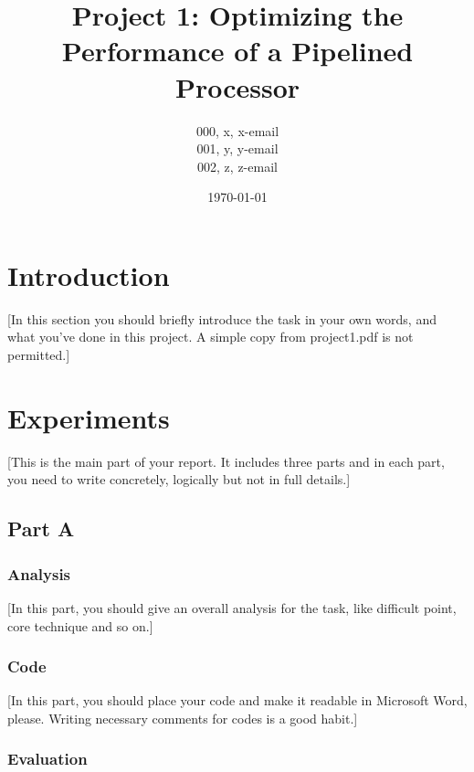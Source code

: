 \documentclass{article}
\title{\textbf{Project 1: Optimizing the Performance of a Pipelined Processor}} %
\author{000, x, x-email \\
        001, y, y-email \\
        002, z, z-email } %
\date{\today} %
\begin{document}
\maketitle %

\section{Introduction}

[In this section you should briefly introduce the task in your own words, and what you’ve done in this project. A simple copy from project1.pdf is not permitted.] \\


\section{Experiments}

[This is the main part of your report. It includes three parts and in each part, you need to write concretely, logically but not in full details.]


\subsection{Part A}

\subsubsection{Analysis}

[In this part, you should give an overall analysis for the task, like difficult point, core technique and so on.]

\subsubsection{Code}

[In this part, you should place your code and make it readable in Microsoft Word, please. Writing necessary comments for codes is a good habit.]

\subsubsection{Evaluation}
\end{document}
